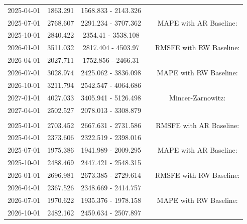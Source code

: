 \begin{table}
\begin{tabular}[t]{ccccc}
\hspace{1em}2025-04-01 & 1863.291 & 1568.833 - 2143.326 &  & \\
\hspace{1em}2025-07-01 & 2768.607 & 2291.234 - 3707.362 &  & MAPE with AR Baseline:\\
\hspace{1em}2025-10-01 & 2840.422 & 2354.41 - 3538.108 &  & \\
\hspace{1em}2026-01-01 & 3511.032 & 2817.404 - 4503.97 &  & RMSFE with RW Baseline:\\
\hspace{1em}2026-04-01 & 2027.711 & 1752.856 - 2466.31 &  & \\
\hspace{1em}2026-07-01 & 3028.974 & 2425.062 - 3836.098 &  & MAPE with RW Baseline:\\
\hspace{1em}2026-10-01 & 3211.794 & 2542.547 - 4064.686 &  & \\
\hspace{1em}2027-01-01 & 4027.033 & 3405.941 - 5126.498 &  & Mincer-Zarnowitz:\\
\hspace{1em}2027-04-01 & 2502.527 & 2078.013 - 3308.879 &  & \\
\addlinespace[0.3em]
\multicolumn{5}{l}{\textbf{EmiCO2ManInd}}\\
\hspace{1em}2025-01-01 & 2703.452 & 2667.631 - 2731.586 &  & RMSFE with AR Baseline:\\
\hspace{1em}2025-04-01 & 2373.606 & 2322.519 - 2398.016 &  & \\
\hspace{1em}2025-07-01 & 1975.386 & 1941.989 - 2009.295 &  & MAPE with AR Baseline:\\
\hspace{1em}2025-10-01 & 2488.469 & 2447.421 - 2548.315 &  & \\
\hspace{1em}2026-01-01 & 2696.981 & 2673.385 - 2729.614 &  & RMSFE with RW Baseline:\\
\hspace{1em}2026-04-01 & 2367.526 & 2348.669 - 2414.757 &  & \\
\hspace{1em}2026-07-01 & 1970.622 & 1935.376 - 1978.158 &  & MAPE with RW Baseline:\\
\hspace{1em}2026-10-01 & 2482.162 & 2459.634 - 2507.897 &  & \\

\end{tabular}
\end{table}
